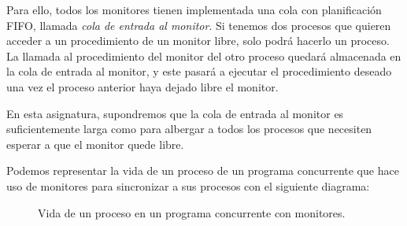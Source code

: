 Para ello, todos los monitores tienen implementada una cola con planificación FIFO, llamada \emph{cola de entrada al monitor}. Si tenemos dos procesos que quieren acceder a un procedimiento de un monitor libre, solo podrá hacerlo un proceso. La llamada al procedimiento del monitor del otro proceso quedará almacenada en la cola de entrada al monitor, y este pasará a ejecutar el procedimiento deseado una vez el proceso anterior haya dejado libre el monitor. 
\begin{observacion}
    En esta asignatura, supondremos que la cola de entrada al monitor es suficientemente larga como para albergar a todos los procesos que necesiten esperar a que el monitor quede libre.
\end{observacion}

Podemos representar la vida de un proceso de un programa concurrente que hace uso de monitores para sincronizar a sus procesos con el siguiente diagrama:
\begin{figure}[H]
\centering
{}
\caption{Vida de un proceso en un programa concurrente con monitores.}
\end{figure}

